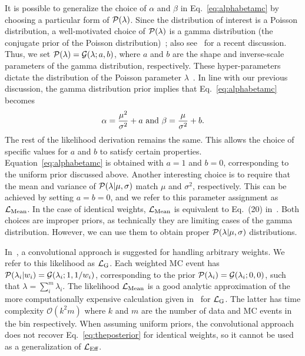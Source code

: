 It is possible to generalize the choice of $\alpha$ and $\beta$ in Eq.~\eqref{eq:alphabetamc} by choosing a particular form of $\mathcal{P}(\lambda)$.
Since the distribution of interest is a Poisson distribution, a well-motivated choice of $\mathcal{P}(\lambda)$ is a gamma distribution (the conjugate prior of the Poisson distribution)~\cite{Fink97acompendium}; also see~\cite{Glusenkamp:2017rlp} for a recent discussion.
Thus, we set $\mathcal{P}(\lambda) = \mathcal{G}(\lambda; a, b)$, where $a$ and $b$ are the shape and inverse-scale parameters of the gamma distribution, respectively.
These hyper-parameters dictate the distribution of the Poisson parameter $\lambda$~\cite{bernardo2009bayesian}.
In line with our previous discussion, the gamma distribution prior implies that Eq.~\eqref{eq:alphabetamc} becomes
\begin{equation}\label{eq:alphabetagamma}
\alpha = \frac{\mu^2}{\sigma^2}+a~\textmd{and}~\beta=\frac{\mu}{\sigma^2}+b.
\end{equation}
The rest of the likelihood derivation remains the same.
This allows the choice of specific values for $a$ and $b$ to satisfy certain properties.
Equation~\eqref{eq:alphabetamc} is obtained with $a=1$ and $b=0$, corresponding to the uniform prior discussed above.
Another interesting choice is to require that the mean and variance of $\mathcal{P}(\lambda|\mu, \sigma)$ match $\mu$ and $\sigma^2$, respectively.
This can be achieved by setting $a=b=0$, and we refer to this parameter assignment as $\mathcal{L}_{\textmd{Mean}}$.
In the case of identical weights, $\mathcal{L}_{\textmd{Mean}}$ is equivalent to Eq.~(20) in~\cite{Glusenkamp:2017rlp}.
Both choices are improper priors, as technically they are limiting cases of the gamma distribution.
However, we can use them to obtain proper $\mathcal{P}(\lambda|\mu, \sigma)$ distributions.

In~\cite{Glusenkamp:2017rlp}, a convolutional approach is suggested for handling arbitrary weights.
We refer to this likelihood as $\mathcal{L}_\textmd{G}$.
Each weighted MC event has $\mathcal{P}(\lambda_i|w_i)=\mathcal{G}(\lambda_i; 1, 1/w_i)$, corresponding to the prior $\mathcal{P}(\lambda_i) = \mathcal{G}(\lambda_i;0,0)$, such that $\lambda = \sum_i^m \lambda_i$.
The likelihood $\mathcal{L}_{\textmd{Mean}}$ is a good analytic approximation of the more computationally expensive calculation given in~\cite{Glusenkamp:2017rlp} for $\mathcal{L}_\textmd{G}$.
The latter has time complexity $\mathcal{O}(k^2 m)$ where $k$ and $m$ are the number of data and MC events in the bin respectively.
When assuming uniform priors, the convolutional approach does not recover Eq.~\eqref{eq:theposterior} for identical weights, so it cannot be used as a generalization of $\mathcal{L}_\textmd{Eff}$.
